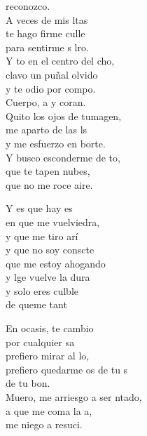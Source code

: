 \begin{cancion}[Culpable][Ixcís]%
	reconozco. \\
	A veces de mis ltas \\
	te hago firme culle \\
	para sentirme s lro. \\
	Y to en el centro del cho,\\
	clavo un puñal olvido \\
	y te odio por compo. \\
	Cuerpo, a y coran. \\
	Quito los ojos de tumagen, \\
	me aparto de las ls \\
	y me esfuerzo en borte. \\
	Y busco esconderme de to,  \\
	que te tapen  nubes,  \\
	que no me roce aire.  \jump\\
	\begin{chorus}%
		Y es que hay es  \\
		en que me vuelviedra, \\
		y que me tiro arí\\
		y que no soy conscte \\
	\jump
	que me estoy ahogando \\
		y lge vuelve la dura \\
		y solo eres culble \\
		de queme tant \jump\\
	\end{chorus}%
	En ocasis, te cambio\\
	por cualquier sa\\
	prefiero mirar al lo, \\
	prefiero quedarme os de tu s \\
	de tu bon. \\
	Muero, me arriesgo a ser ntado, \\
	a que me coma la a, \\
	me niego a resuci.   \\
\end{cancion}%
